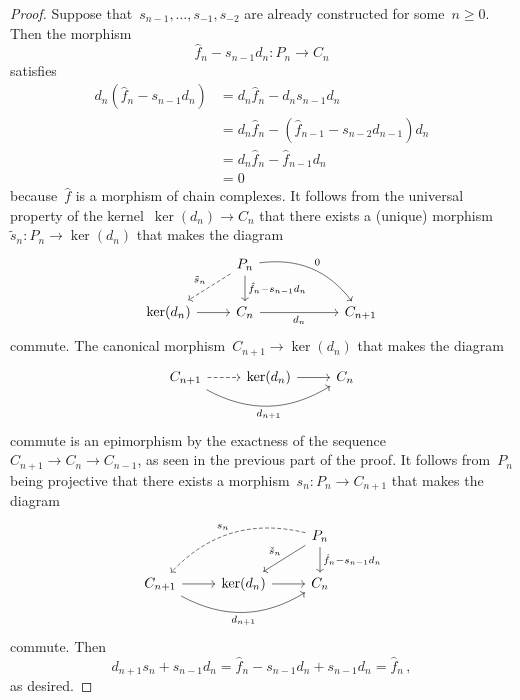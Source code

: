 \begin{proof}
  Suppose that~$s_{n-1}, \dotsc, s_{-1}, s_{-2}$ are already constructed for some~$n \geq 0$.
  Then the morphism
  \[
    \hat{f}_n - s_{n-1} d_n
    \colon
    P_n
    \to
    C_n
  \]
  satisfies
  \begin{align*}
        d_n ( \hat{f}_n - s_{n-1} d_n)
    &=  d_n \hat{f}_n - d_n s_{n-1} d_n \\
    &=  d_n \hat{f}_n - ( \hat{f}_{n-1} - s_{n-2} d_{n-1} ) d_n  \\
    &=  d_n \hat{f}_n - \hat{f}_{n-1} d_n  \\
    &=  0
  \end{align*}
  because~$\hat{f}$ is a morphism of chain complexes.
  It follows from the universal property of the kernel~$\ker(d_n) \to C_n$ that there exists a (unique) morphism~$\tilde{s}_n \colon P_n \to \ker(d_n)$ that makes the diagram
  \[
    \begin{tikzcd}
        {}
      & P_n
        \arrow[bend left]{drr}[above right]{0}
        \arrow{d}[right]{\hat{f}_n - s_{n-1} d_n}
        \arrow[dashed]{dl}[above left]{\tilde{s}_n}
      & {}
      \\
        \ker(d_n)
        \arrow{r}
      & C_n
        \arrow{rr}[below]{d_n}
      & {}
      & C_{n+1}
    \end{tikzcd}
  \]
  commute.
  The canonical morphism~$C_{n+1} \to \ker(d_n)$ that makes the diagram
  \[
    \begin{tikzcd}
        C_{n+1}
        \arrow[dashed]{r}
        \arrow[bend right]{rr}[below]{d_{n+1}}
      & \ker(d_n)
        \arrow{r}
      & C_n
    \end{tikzcd}
  \]
  commute is an epimorphism by the exactness of the sequence~$C_{n+1} \to C_n \to C_{n-1}$, as seen in the previous part of the proof.
  It follows from~$P_n$ being projective that there exists a morphism~$s_n \colon P_n \to C_{n+1}$ that makes the diagram
  \[
    \begin{tikzcd}
        {}
      & {}
      & P_n
        \arrow{d}[right]{\hat{f}_n - s_{n-1} d_n}
        \arrow{dl}[above left]{\tilde{s}_n}
        \arrow[dashed, bend right]{dll}[above left]{s_n}
      \\
        C_{n+1}
        \arrow{r}
        \arrow[bend right]{rr}[below]{d_{n+1}}
      & \ker(d_n)
        \arrow{r}
      & C_n
    \end{tikzcd}
  \]
  commute.
  Then
  \[
      d_{n+1} s_n + s_{n-1} d_n
    = \hat{f}_n - s_{n-1} d_n + s_{n-1} d_n
    = \hat{f}_n \,,
  \]
  as desired.
\end{proof}


